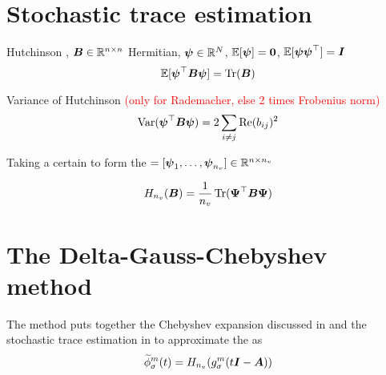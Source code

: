 
\section{Stochastic trace estimation}
\label{sec:2-chebyshev-stochastic-trace-estimation}

Hutchinson \cite{hutchinson1990trace}, $\boldsymbol{B} \in \mathbb{R}^{n \times n}$ Hermitian,
$\boldsymbol{\psi} \in \mathbb{R}^N$, $\mathbb{E}[\boldsymbol{\psi}] = \boldsymbol{0}$, $\mathbb{E}[\boldsymbol{\psi}\boldsymbol{\psi}^{\top}] = \boldsymbol{I}$ 
\begin{equation}
    \mathbb{E}[\boldsymbol{\psi}^{\top} \boldsymbol{B} \boldsymbol{\psi}] = \operatorname{Tr}(\boldsymbol{B})
    \label{equ:2-chebyshev-DGC-hutchinson}
\end{equation}

Variance of Hutchinson \cite[Proposition~1]{hutchinson1990trace} \textcolor{red}{(only for Rademacher, else 2 times Frobenius norm)}
\begin{equation}
    \operatorname{Var}(\boldsymbol{\psi}^{\top} \boldsymbol{B} \boldsymbol{\psi}) = 2 \sum_{i \neq j} \operatorname{Re}(b_{ij})^2
    \label{equ:2-chebyshev-DGC-hutchinson-variance}
\end{equation}

Taking a certain  to form the
 $= [\boldsymbol{\psi}_1, \dots, \boldsymbol{\psi}_{n_v}] \in \mathbb{R}^{n \times n_v}$

\begin{equation}
    H_{n_v}(\boldsymbol{B}) = \frac{1}{n_v} \operatorname{Tr}(\boldsymbol{\Psi}^{\top} \boldsymbol{B} \boldsymbol{\Psi})
    \label{equ:2-chebyshev-DGC-hutchionson-estimator}
\end{equation}


\section{The Delta-Gauss-Chebyshev method}
\label{sec:2-chebyshev-delta-gauss-chebyshev}

The  method \cite[Algorithm~2]{lin2017randomized} puts together the 
Chebyshev expansion discussed in  and 
the stochastic trace estimation in 
to approximate the  as
\begin{equation}
    \widetilde{\phi}_{\sigma}^m(t) = H_{n_v}(g_{\sigma}^m(t\boldsymbol{I} - \boldsymbol{A}))
    \label{equ:2-chebyshev-DGC-final-estimator}
\end{equation}

